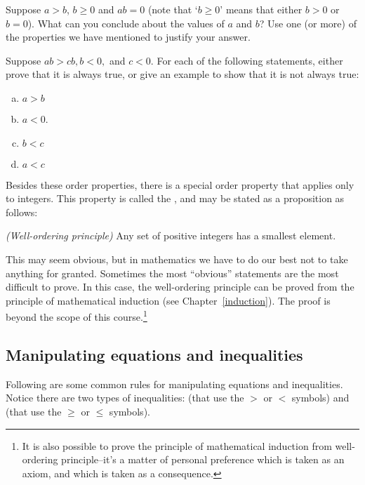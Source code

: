 \begin{exercise}{3}
Suppose $a > b$,  $b \ge 0$ and $ab = 0$ (note that `$b \ge 0$' means that either $b>0$ or $b=0$).  What can you conclude about the values of $a$ and $b$? Use one (or more)  of the properties we have mentioned to justify your answer.
\end{exercise}

\begin{exercise}{}
Suppose $ab>cb, b < 0,$ and $c<0$.  For each of the following statements, either prove that it is always true, or give an example to show that
it is not always true:
\begin{enumerate}[(a)]
\item
$a > b$ \qquad 
\item
$a < 0$.
\item
$b < c$ \qquad 
\item
$a < c$ \qquad 
\end{enumerate}
\end{exercise}

Besides these order properties, there is a special order property that applies only to integers. This property is called the , and may be stated as a proposition as follows:

\begin{prop}{}\emph{(Well-ordering principle)}
Any set of positive integers  has a smallest element.
\end{prop}

\noindent
This may seem obvious, but in mathematics we have to do our best not to take anything for granted.  Sometimes the most ``obvious'' statements are the most difficult to prove. In this case, the well-ordering principle can be proved from the principle of mathematical induction (see Chapter~\ref{induction}). The proof is beyond the scope of this course.\footnote{It is also possible to prove the principle of mathematical induction from well-ordering principle--it's a matter of personal preference which is taken as an axiom, and which is taken as a consequence.}


\subsection {Manipulating equations and inequalities}
\label{subsec:eqsAndIneqs}

Following are some common rules for manipulating equations and inequalities. Notice there are two types of inequalities:   (that use the $>$ or $<$ symbols) and  (that use the $\ge$ or $\le$ symbols). 

